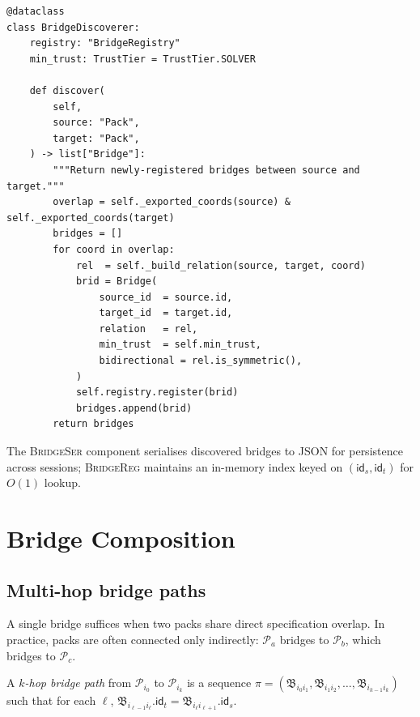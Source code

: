 \documentclass[11pt]{article}
\newcommand{\Pack}{\mathcal{P}}
\newcommand{\Brid}{\mathfrak{B}}
\newcommand{\PackId}{\mathsf{id}}
\newcommand{\BR}{\textsc{BridgeReg}}
\newcommand{\BD}{\textsc{BridgeDisc}}
\newcommand{\BSer}{\textsc{BridgeSer}}
\begin{document}
\begin{lstlisting}[style=jugeo-python, caption={\BD{} core discovery loop.}]
@dataclass
class BridgeDiscoverer:
    registry: "BridgeRegistry"
    min_trust: TrustTier = TrustTier.SOLVER

    def discover(
        self,
        source: "Pack",
        target: "Pack",
    ) -> list["Bridge"]:
        """Return newly-registered bridges between source and target."""
        overlap = self._exported_coords(source) & self._exported_coords(target)
        bridges = []
        for coord in overlap:
            rel  = self._build_relation(source, target, coord)
            brid = Bridge(
                source_id  = source.id,
                target_id  = target.id,
                relation   = rel,
                min_trust  = self.min_trust,
                bidirectional = rel.is_symmetric(),
            )
            self.registry.register(brid)
            bridges.append(brid)
        return bridges
\end{lstlisting}

The \BSer{} component serialises discovered bridges to JSON for
persistence across sessions; \BR{} maintains an in-memory index keyed
on $(\PackId_s, \PackId_t)$ for $O(1)$ lookup.

\section{Bridge Composition}
\label{sec:composition}

\subsection{Multi-hop bridge paths}

A single bridge suffices when two packs share direct specification
overlap.  In practice, packs are often connected only indirectly:
$\Pack_a$ bridges to $\Pack_b$, which bridges to $\Pack_c$.

\begin{definition}
\label{def:bridge-path}
A \emph{$k$-hop bridge path} from $\Pack_{i_0}$ to $\Pack_{i_k}$
is a sequence $\pi = (\Brid_{i_0 i_1}, \Brid_{i_1 i_2}, \ldots,
\Brid_{i_{k-1} i_k})$ such that for each $\ell$,
$\Brid_{i_{\ell-1} i_\ell}.\PackId_t = \Brid_{i_\ell i_{\ell+1}}.\PackId_s$.
\end{definition}
\end{document}
